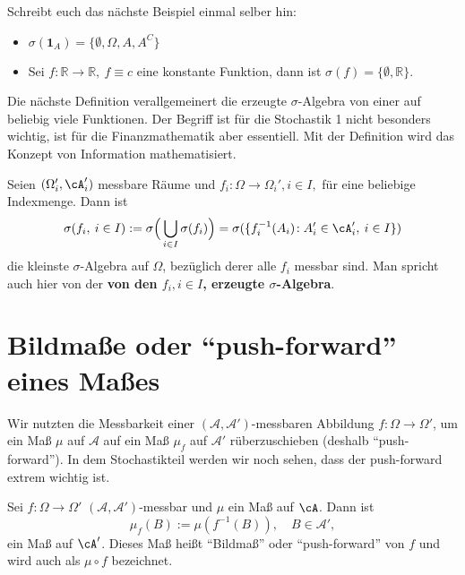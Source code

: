 Schreibt euch das n\"achste Beispiel einmal selber hin:
\begin{beispiel}
\label{yu}\abs
	\begin{itemize}
		\item $\sigma(\mathbf{1}_A) = \{ \emptyset, \Omega, A, A^C \}$
		\item Sei $f \! : \mathbb{R} \rightarrow \mathbb{R}, \: f\equiv c$ eine konstante Funktion, dann ist $\sigma(f) = \{ \emptyset, \mathbb{R} \}$.
	\end{itemize}
\end{beispiel}
Die n\"achste Definition verallgemeinert die erzeugte $\sigma$-Algebra von einer auf beliebig viele Funktionen. Der Begriff ist f\"ur die Stochastik 1 nicht besonders wichtig, ist f\"ur die Finanzmathematik aber essentiell. Mit der Definition wird das Konzept von Information mathematisiert.
\begin{deff}
	Seien $(\Omega_i',\cA_i')$ messbare Räume und $f_i \! : \Omega \rightarrow \Omega_i', i \in I,$ f\"ur eine beliebige Indexmenge. Dann ist \[\sigma(f_i, \: i \in I) := \sigma \Big(\bigcup_{i \in I}\sigma(f_i)\Big) = \sigma(\{ f_i^{-1}(A_i) \! : A'_i \in \cA'_i, \: i \in I \}) \] die kleinste $\sigma$-Algebra auf $\Omega$, bez\"uglich derer alle $f_i$ messbar sind. Man spricht auch hier von der \textbf{von den $f_i, i\in I$, erzeugte $\sigma$-Algebra}.
\end{deff}

\section{Bildmaße oder \enquote{push-forward} eines Maßes}\label{sec:push}

Wir nutzten die Messbarkeit einer $(\mathcal A, \mathcal A')$-messbaren Abbildung $f:\Omega\to \Omega'$, um ein Ma\ss{} $\mu$ auf $\mathcal A$ auf ein Ma\ss{} $\mu_f$ auf $\mathcal A'$ r\"uberzuschieben (deshalb \enquote{push-forward}). In dem Stochastikteil werden wir noch sehen, dass der push-forward extrem wichtig ist.

\begin{satz}\label{pushf}
	Sei $f:\Omega \rightarrow \Omega'$ $(\mathcal A, \mathcal A')$-messbar und $\mu$ ein Maß auf $\cA$. Dann ist 
	\[ \mu_f(B) := \mu\left(f^{-1}(B)\right),\quad B\in \mathcal A', \] ein Maß auf $\cA'$. Dieses Maß heißt \enquote{Bildmaß} oder \enquote{push-forward} von $f$ und wird auch als $\mu\circ f$ bezeichnet.
\end{satz}

